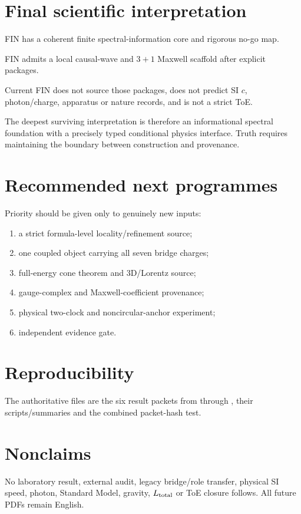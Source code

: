 \documentclass[11pt,a4paper]{article}
\begin{document}
\section{Final scientific interpretation}
\prv{} FIN has a coherent finite spectral-information core and rigorous no-go map.

\cnd{} FIN admits a local causal-wave and $3+1$ Maxwell scaffold after explicit packages.

\blk{} Current FIN does not source those packages, does not predict SI $c$, photon/charge, apparatus or nature records, and is not a strict ToE.

The deepest surviving interpretation is therefore an informational spectral foundation with a precisely typed conditional physics interface. Truth requires maintaining the boundary between construction and provenance.

\section{Recommended next programmes}
Priority should be given only to genuinely new inputs:
\begin{enumerate}
\item a strict formula-level locality/refinement source;
\item one coupled object carrying all seven bridge charges;
\item full-energy cone theorem and $3$D/Lorentz source;
\item gauge-complex and Maxwell-coefficient provenance;
\item physical two-clock and noncircular-anchor experiment;
\item independent evidence gate.
\end{enumerate}

\appendix\section{Reproducibility}
The authoritative files are the six result packets from  through , their scripts/summaries and the combined packet-hash test.

\section{Nonclaims}
No laboratory result, external audit, legacy bridge/role transfer, physical SI speed, photon, Standard Model, gravity, $L_{\rm total}$ or ToE closure follows. All future PDFs remain English.
\end{document}
